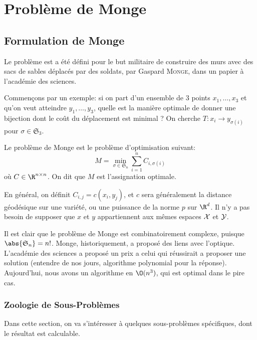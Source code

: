 
\section{Problème de Monge}
\subsection{Formulation de Monge}
Le problème est a été défini pour le but militaire de construire des murs avec des sacs de sables déplacés
par des soldats, par Gaspard \textsc{Monge}, dans un papier à l'académie des sciences.

Commençons par un exemple: si on part d'un ensemble de $3$ points $x_{1}, \ldots, x_{3}$ et qu'on veut atteindre $y_{1}, \ldots, y_{3}$, quelle est la manière optimale de donner une bijection dont le coût du
déplacement est minimal ?
On cherche $T: x_{i} \to y_{\sigma(i)}$ pour $\sigma \in \mathfrak{S}_{3}$.

\begin{definition}
	Le problème de Monge est le problème d'optimisation suivant:
	\begin{equation}
		M = \min_{\sigma \in \mathfrak{S}_{n}}\sum_{i = 1}^{n} C_{i, \sigma(i)} \tag{Monge}\label{eq:M}
	\end{equation}
	où $C \in \R^{n \times n}$. On dit que $M$ est l'assignation optimale.
\end{definition}

En général, on définit $C_{i, j} = c(x_{i}, y_{j})$, et $c$ sera généralement la distance géodésique sur une variété, ou une puissance de la norme $p$ sur $\R^{d}$.
Il n'y a pas besoin de supposer que $x$ et $y$ appartiennent aux mêmes espaces $\mathcal{X}$ et $\mathcal{Y}$.

Il est clair que le problème de Monge est combinatoirement complexe, puisque $\abs{\mathfrak{S}_{n}} = n!$.
Monge, historiquement, a proposé des liens avec l'optique. L'académie des sciences a proposé un prix a
celui qui réussirait a proposer une solution (entendre de nos jours, algorithme polynomial pour la réponse).
Aujourd'hui, nous avons un algorithme en $\O(n^{3})$, qui est optimal dans le pire cas.

\subsubsection{Zoologie de Sous-Problèmes}
Dans cette section, on va s'intéresser à quelques sous-problèmes spécifiques, dont le résultat est calculable.

